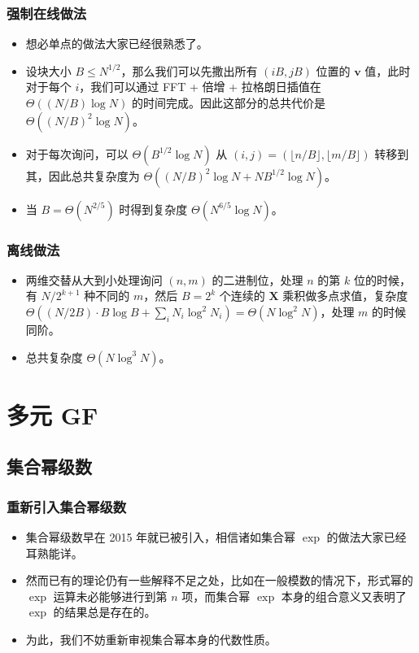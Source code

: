 \documentclass[mathserif]{ctexbeamer}
\begin{document}
\frame
{
  \frametitle{强制在线做法}
  
  \begin{itemize}
  \item<1-> 想必单点的做法大家已经很熟悉了。
  \item<2-> 设块大小 $B\le N^{1/2}$，那么我们可以先撒出所有 $(iB,jB)$ 位置的 $\mathbf v$ 值，此时对于每个 $i$，我们可以通过 FFT + 倍增 + 拉格朗日插值在 $\Theta((N/B)\log N)$ 的时间完成。因此这部分的总共代价是 $\Theta((N/B)^2\log N)$。
  \item<3-> 对于每次询问，可以 $\Theta(B^{1/2}\log N)$ 从 $(i,j) = (\lfloor n/B\rfloor,\lfloor m/B\rfloor)$ 转移到其，因此总共复杂度为 $\Theta((N/B)^2\log N + NB^{1/2}\log N)$。
  \item<4-> 当 $B=\Theta(N^{2/5})$ 时得到复杂度 $\Theta(N^{6/5}\log N)$。
  \end{itemize}
}

\frame
{
  \frametitle{离线做法}
  
  \begin{itemize}
  \item<1-> 两维交替从大到小处理询问 $(n,m)$ 的二进制位，处理 $n$ 的第 $k$ 位的时候，有 $N/2^{k+1}$ 种不同的 $m$，然后 $B=2^k$ 个连续的 $\mathbf X$ 乘积做多点求值，复杂度 $\Theta((N/2B) \cdot B \log B + \sum_i N_i \log^2 N_i) = \Theta(N\log^2 N)$，处理 $m$ 的时候同阶。
  \item<2-> 总共复杂度 $\Theta(N\log^3 N)$。
  \end{itemize}
}

\section{多元 GF}
\frame{\sectionpage}

\subsection{集合幂级数}

\frame
{
  \frametitle{重新引入集合幂级数}
  
  \begin{itemize}
  \item<1-> 集合幂级数早在 2015 年就已被引入，相信诸如集合幂 $\exp$ 的做法大家已经耳熟能详。
  \item<2-> 然而已有的理论仍有一些解释不足之处，比如在一般模数的情况下，形式幂的 $\exp$ 运算未必能够进行到第 $n$ 项，而集合幂 $\exp$ 本身的组合意义又表明了 $\exp$ 的结果总是存在的。
  \item<3-> 为此，我们不妨重新审视集合幂本身的代数性质。
  \end{itemize}
}
\end{document}
